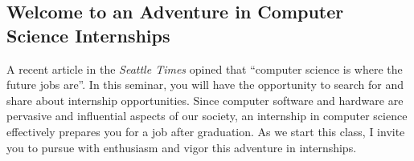 \subsection*{Welcome to an Adventure in Computer Science Internships}

A recent article in the {\em Seattle Times} opined that ``computer science is where the future jobs are''.  In this
seminar, you will have the opportunity to search for and share about internship opportunities.  Since computer software
and hardware are pervasive and influential aspects of our society, an internship in computer science effectively
prepares you for a job after graduation.  As we start this class, I invite you to pursue with enthusiasm and
vigor this adventure in internships.



